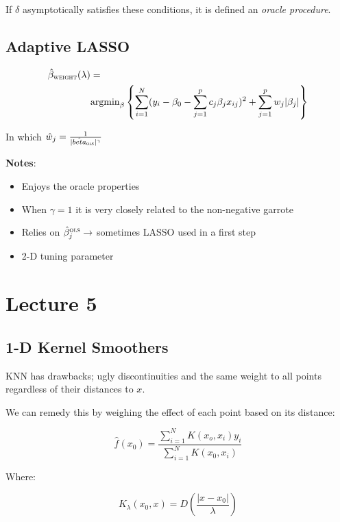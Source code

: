 \documentclass[twoside,twocolumn,10pt]{revtex4-1}
\begin{document}
	If $\delta$ asymptotically satisfies these conditions, it is defined an \textit{oracle procedure}.
	
	\subsection{Adaptive LASSO}
	
		
	\begin{align*}
	\hat{\beta}_\textsc{weight} (\lambda) &= \\ &\text{argmin}_\beta \left\lbrace \sum_{i=1}^N (y_i - \beta_0 - \sum_{j=1}^p c_j \beta_j x_{ij} )^2 + \sum_{j=1}^p w_j | \beta_j | \right\rbrace
	\end{align*}
	
	In which $\hat{w}_j = \frac{1}{|\hat{beta}_\textsc{ols}|^\gamma}$
	
	\textbf{Notes}:
	\begin{itemize}
	\item Enjoys the oracle properties
	\item When $\gamma = 1$ it is very closely related to the non-negative garrote
	\item Relies on $\hat{\beta}_j^\textsc{ols} \to $ sometimes LASSO used in a first step
	\item 2-D tuning parameter
	\end{itemize}
	
	\section{Lecture 5}
	
	\subsection{1-D Kernel Smoothers}
	
	KNN has drawbacks; ugly discontinuities and the same weight to all points regardless of their distances to $x$.
	
	We can remedy this by weighing the effect of each point based on its distance:
	
	\begin{equation}
	\hat{f}(x_0) = \frac{\sum_{i=1}^N K(x_o, x_i) y_i}{\sum_{i=1}^N K (x_0, x_i)}
	\end{equation}
	
	Where:
	
	\begin{equation}
	K_\lambda (x_0, x) = D \left( \frac{|x - x_0|}{\lambda} \right)
	\end{equation}
	
\end{document}
